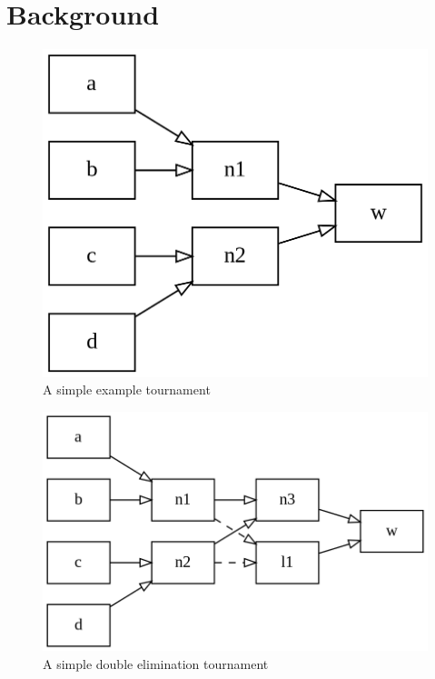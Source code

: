 \documentclass{article}
\begin{document}
\section{Background}

\begin{figure}
  \centering
  \includegraphics[width=\textwidth]{single-elim.png}
  \caption{A simple example tournament}
  \label{fig:single-elim}
\end{figure}

\begin{figure}
  \centering
  \includegraphics[width=\textwidth]{double-elim.png}
  \caption{A simple double elimination tournament}
  \label{fig:double-elim}
\end{figure}
\end{document}
